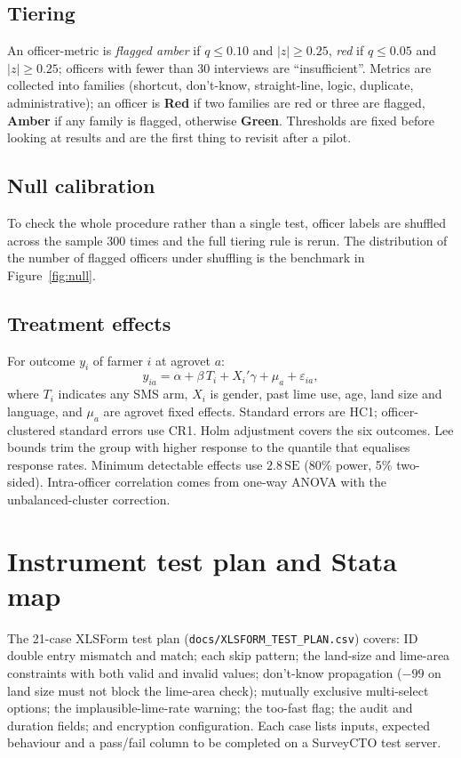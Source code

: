 \documentclass[11pt,a4paper]{article}
\begin{document}
\subsection{Tiering}
An officer-metric is \emph{flagged amber} if $q\le0.10$ and $|z|\ge0.25$, \emph{red} if $q\le0.05$ and $|z|\ge0.25$; officers with fewer than 30 interviews are ``insufficient''. Metrics are collected into families (shortcut, don't-know, straight-line, logic, duplicate, administrative); an officer is \textbf{Red} if two families are red or three are flagged, \textbf{Amber} if any family is flagged, otherwise \textbf{Green}. Thresholds are fixed before looking at results and are the first thing to revisit after a pilot.

\subsection{Null calibration}
To check the whole procedure rather than a single test, officer labels are shuffled across the sample 300 times and the full tiering rule is rerun. The distribution of the number of flagged officers under shuffling is the benchmark in Figure~\ref{fig:null}.

\subsection{Treatment effects}
For outcome $y_i$ of farmer $i$ at agrovet $a$:
\[ y_{ia}=\alpha+\beta\,T_i+X_i'\gamma+\mu_a+\varepsilon_{ia}, \]
where $T_i$ indicates any SMS arm, $X_i$ is gender, past lime use, age, land size and language, and $\mu_a$ are agrovet fixed effects. Standard errors are HC1; officer-clustered standard errors use CR1. Holm adjustment covers the six outcomes. Lee bounds trim the group with higher response to the quantile that equalises response rates. Minimum detectable effects use $2.8\,\mathrm{SE}$ (80\% power, 5\% two-sided). Intra-officer correlation comes from one-way ANOVA with the unbalanced-cluster correction.

\section{Instrument test plan and Stata map}
The 21-case XLSForm test plan (\texttt{docs/XLSFORM\_TEST\_PLAN.csv}) covers: ID double entry mismatch and match; each skip pattern; the land-size and lime-area constraints with both valid and invalid values; don't-know propagation ($-99$ on land size must not block the lime-area check); mutually exclusive multi-select options; the implausible-lime-rate warning; the too-fast flag; the audit and duration fields; and encryption configuration. Each case lists inputs, expected behaviour and a pass/fail column to be completed on a SurveyCTO test server.
\end{document}
